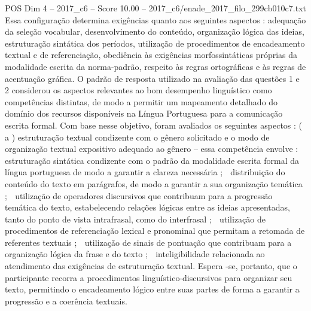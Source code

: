 \begin{textsample}{POS Dim 4 – 2017\_c6 – Score 10.00 – 2017\_c6/enade\_2017\_filo\_299cb010c7.txt}
Essa configuração determina exigências quanto aos seguintes aspectos : adequação da seleção vocabular, desenvolvimento do conteúdo, organização lógica das ideias, estruturação sintática dos períodos, utilização de procedimentos de encadeamento textual e de referenciação, obediência às exigências morfossintáticas próprias da modalidade escrita da norma-padrão, respeito às regras ortográficas e às regras de acentuação gráfica.
O padrão de resposta utilizado na avaliação das questões 1 e 2 considerou os aspectos relevantes ao bom desempenho linguístico como competências distintas, de modo a permitir um mapeamento detalhado do domínio dos recursos disponíveis na Língua Portuguesa para a comunicação escrita formal.
Com base nesse objetivo, foram avaliados os seguintes aspectos : ( a ) estruturação textual condizente com o gênero solicitado e o modo de organização textual expositivo adequado ao gênero – essa competência envolve :  estruturação sintática condizente com o padrão da modalidade escrita formal da língua portuguesa de modo a garantir a clareza necessária ;  distribuição do conteúdo do texto em parágrafos, de modo a garantir a sua organização temática ;  utilização de operadores discursivos que contribuam para a progressão temática do texto, estabelecendo relações lógicas entre as ideias apresentadas, tanto do ponto de vista intrafrasal, como do interfrasal ;  utilização de procedimentos de referenciação lexical e pronominal que permitam a retomada de referentes textuais ;  utilização de sinais de pontuação que contribuam para a organização lógica da frase e do texto ;  inteligibilidade relacionada ao atendimento das exigências de estruturação textual.
Espera -se, portanto, que o participante recorra a procedimentos linguístico-discursivos para organizar seu texto, permitindo o encadeamento lógico entre suas partes de forma a garantir a progressão e a coerência textuais.

\end{textsample}
